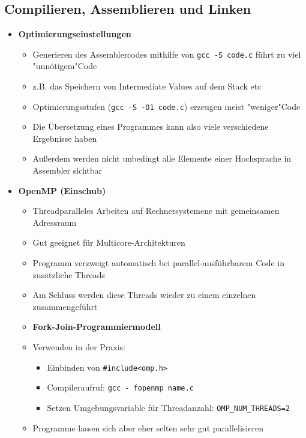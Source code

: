 \pagebreak

\subsection{Compilieren, Assemblieren und Linken}
    \begin{itemize}
        \item \textbf{Optimierungseinstellungen}
            \begin{itemize}
                \item Generieren des Assemblercodes mithilfe von \texttt{gcc -S code.c} führt zu viel \string"unnötigem"\string Code
                \item z.B. das Speichern von Intermediate Values auf dem Stack etc
                \item Optimierungsstufen (\texttt{gcc -S -O1 code.c}) erzeugen meist \string"weniger"\string Code
                \item Die Übersetzung eines Programmes kann also viele verschiedene Ergebnisse haben
                \item Außerdem werden nicht unbedingt alle Elemente einer Hochsprache in Assembler sichtbar
            \end{itemize}

        \item \textbf{OpenMP (Einschub)}
            \begin{itemize}
                \item Threadparalleles Arbeiten auf Rechnersystemene mit gemeinsamen Adressraum
                \item Gut geeignet für Multicore-Architekturen
                \item Programm verzweigt automatisch bei parallel-ausführbarem Code in zusätzliche Threads
                \item Am Schluss werden diese Threads wieder zu einem einzelnen zusammengeführt
                \item \textbf{Fork-Join-Programmiermodell}
                \item Verwenden in der Praxis:
                    \begin{itemize}
                        \item Einbinden von \texttt{\#include<omp.h>}
                        \item Compileraufruf: \texttt{gcc - fopenmp name.c}
                        \item Setzen Umgebungsvariable für Threadanzahl: \texttt{OMP\_NUM\_THREADS=2}
                    \end{itemize}
                \item Programme lassen sich aber eher selten sehr gut parallelisieren
            \end{itemize}


\end{itemize}

